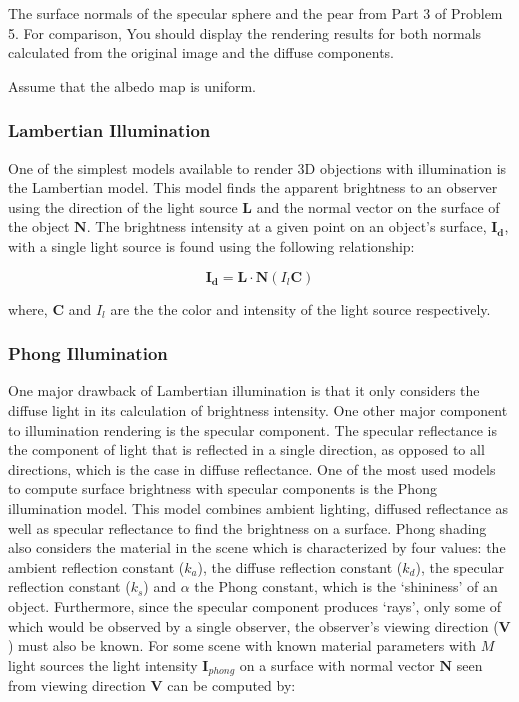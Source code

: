 \documentclass[11pt]{article}
\begin{document}
The surface normals of the specular sphere and the pear from Part 3 of
Problem 5. For comparison, You should display the rendering results for
both normals calculated from the original image and the diffuse
components.

Assume that the albedo map is uniform.

    \hypertarget{lambertian-illumination}{%
\subsubsection{Lambertian Illumination}\label{lambertian-illumination}}

One of the simplest models available to render 3D objections with
illumination is the Lambertian model. This model finds the apparent
brightness to an observer using the direction of the light source
\(\mathbf{L}\) and the normal vector on the surface of the object
\(\mathbf{N}\). The brightness intensity at a given point on an object's
surface, \(\mathbf{I_d}\), with a single light source is found using the
following relationship:

\[\mathbf{I_d} = \mathbf{L} \cdot \mathbf{N} (I_l\mathbf{C})\]

where, \(\mathbf{C}\) and \(I_l\) are the the color and intensity of the
light source respectively.

\hypertarget{phong-illumination}{%
\subsubsection{Phong Illumination}\label{phong-illumination}}

One major drawback of Lambertian illumination is that it only considers
the diffuse light in its calculation of brightness intensity. One other
major component to illumination rendering is the specular component. The
specular reflectance is the component of light that is reflected in a
single direction, as opposed to all directions, which is the case in
diffuse reflectance. One of the most used models to compute surface
brightness with specular components is the Phong illumination model.
This model combines ambient lighting, diffused reflectance as well as
specular reflectance to find the brightness on a surface. Phong shading
also considers the material in the scene which is characterized by four
values: the ambient reflection constant (\(k_a\)), the diffuse
reflection constant (\(k_d\)), the specular reflection constant
(\(k_s\)) and \(\alpha\) the Phong constant, which is the `shininess' of
an object. Furthermore, since the specular component produces `rays',
only some of which would be observed by a single observer, the
observer's viewing direction (\(\mathbf{V}\)) must also be known. For
some scene with known material parameters with \(M\) light sources the
light intensity \(\mathbf{I}_{phong}\) on a surface with normal vector
\(\mathbf{N}\) seen from viewing direction \(\mathbf{V}\) can be
computed by:
\end{document}
